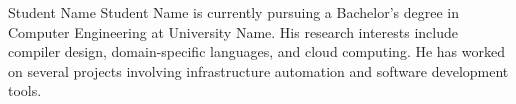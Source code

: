 \documentclass[journal,twocolumn,10pt]{IEEEtran}
\begin{document}
\begin{IEEEbiography}
\begin{IEEEbiographynophoto}{Student Name}
Student Name is currently pursuing a Bachelor's degree in Computer Engineering at University Name. His research interests include compiler design, domain-specific languages, and cloud computing. He has worked on several projects involving infrastructure automation and software development tools.
\end{IEEEbiographynophoto}
\end{IEEEbiography}
\end{document}
